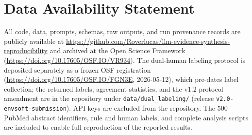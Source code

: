\documentclass[preprint,review,12pt,authoryear]{elsarticle}
\begin{document}
\section*{Data Availability Statement}
All code, data, prompts, schemas, raw outputs, and run provenance records are publicly available at \url{https://github.com/Roverlucas/llm-evidence-synthesis-reproducibility} and archived at the Open Science Framework (\url{https://doi.org/10.17605/OSF.IO/VR934}).
The dual-human labeling protocol is deposited separately as a frozen OSF registration (\url{https://doi.org/10.17605/OSF.IO/FGN3E}, 2026-05-12), which pre-dates label collection; the returned labels, agreement statistics, and the v1.2 protocol amendment are in the repository under \texttt{data/dual\_labeling/} (release \texttt{v2.0-envsoft-submission}).
API keys are excluded from the repository.
The 500 PubMed abstract identifiers, rule and human labels, and complete analysis scripts are included to enable full reproduction of the reported results.



\end{document}
